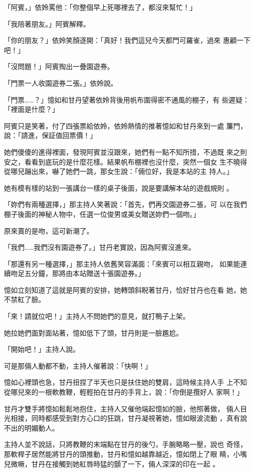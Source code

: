 「阿賓，」依姈罵他：「你整個早上死哪裡去了，都沒來幫忙！」

「我陪著朋友。」阿賓解釋。

「你的朋友？」依姈笑顏逐開：「真好！我們這兒今天都門可羅雀，過來
惠顧一下吧！」

「沒問題！」阿賓掏出一疊園遊券。

「門票一人收園遊券二張。」依姈說。

「門票……？」憶如和甘丹望著依姈背後用帆布圍得密不通風的棚子，有
些遲疑：「裡面是什麼？」

阿賓只是笑著，付了四張票給依姈，依姈熱情的推著憶如和甘丹來到一處
簾門，說：「請進，保証值回票價！」

她們傻傻的進得裡面，發現阿賓並沒跟來，她們有一點不知所措，不過既
來之則安之，看看到底玩的是什麼花樣。結果帆布棚裡也沒什麼，突然一個女
生不曉得從哪兒蹦出來，嚇了她們一跳，那女生說：「倆位好，我是本站的主
持人。」

她有模有樣的站到一張講台一樣的桌子後面，說是要講解本站的遊戲規則
。

「妳們有兩種選擇，」那主持人笑著說：「首先，們再交園遊券二張，可
以在我們棚子後面的神秘人物中，任選一位俊男或美女贈送妳們一個吻。」

原來賣的是吻，這可新潮了。

「我們……我們沒有園遊券了。」甘丹老實說，因為阿賓沒進來。

「那還有另一種選擇，」那主持人依舊笑容滿面：「來賓可以相互親吻，
如果能連續吻足五分鐘，那將由本站贈送十張園遊券。」

憶如立刻知道了這就是阿賓的安排，她轉頭斜睨著甘丹，恰好甘丹也在看
她，她不禁紅了臉。

「來！請就位吧！」主持人不問她們的意見，就打鴨子上架。

她拉她們面對面站著，憶如低下了頭，甘丹則是一臉尷尬。

「開始吧！」主持人說。

可是那倆人動都不動，主持人催著說：「快啊！」

憶如心裡頭也急，甘丹扭捏了半天也只是扶住她的雙肩，這時候主持人手
上不知從哪兒來的一根軟教鞭，輕輕拍在甘丹的手背上，說：「你倒是攬好人
家啊！」

甘丹才雙手將憶如鬆鬆地抱住，主持人又催他端起憶如的臉，他照著做，
倆人目光相接，同時都感受到對方心口的狂跳，甘丹凝視著她，憶如眼波流動
，真有說不出的明媚動人。

主持人並不說話，只將教鞭的末端點在甘丹的後勺，手腕略略一壓，說也
奇怪，那軟桿子居然能將甘丹的頭推動，甘丹和憶如越靠越近，憶如閉上了眼
睛，小嘴兒微噘，甘丹在接觸到她紅唇時猛的顫了一下，倆人深深的印在一起
。

